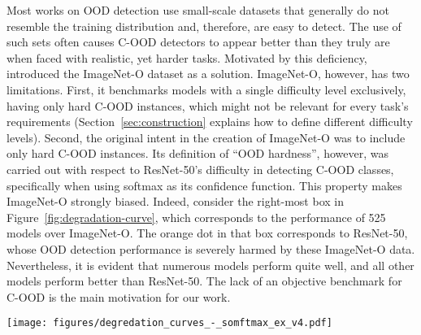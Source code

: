 \documentclass[table]{article} \usepackage{PRIMEarxiv}
\begin{document}
Most works on OOD detection use small-scale datasets that generally do not resemble the training distribution and, therefore, are easy to detect. 
The use of such sets often causes C-OOD detectors to appear better than they truly are when faced with realistic, yet harder tasks. Motivated by this deficiency, \citet{DBLP:conf/cvpr/HendrycksZBSS21} introduced the ImageNet-O dataset as a solution. ImageNet-O, however, has two limitations. First, it benchmarks models with a single difficulty level exclusively, having only hard C-OOD instances, which might not be relevant for every task's requirements (Section~\ref{sec:construction} explains how to define different difficulty levels).
Second, the original intent in the creation of ImageNet-O was to include only hard C-OOD instances. Its definition of ``OOD hardness'', however, was carried out with respect to ResNet-50's difficulty in detecting C-OOD classes, specifically when using softmax as its confidence function.
This property makes ImageNet-O strongly biased. Indeed, consider the right-most box in Figure~\ref{fig:degradation-curve}, which corresponds to the performance of 525 models over ImageNet-O. \textcolor{myorange}{The orange dot} in that box corresponds to ResNet-50, whose OOD detection performance is severely harmed by these ImageNet-O data. Nevertheless, it is evident that numerous models perform quite well, and all other models perform better than ResNet-50. 
The lack of an objective benchmark for C-OOD is the main motivation for our work.
\begin{figure*}[h]
    \centering
    \texttt{[image: figures/degredation\_curves\_-\_somftmax\_ex\_v4.pdf]}
    \caption{OOD performance across severity (difficulty) levels, using the benchmarks produced by our framework.
The detection performance decreases for all models as we increase the difficulty until it reaches near chance detection performance at the highest severity ($s_{10})$. The top curve belongs to \textcolor{myteal}{ViT-L/32-384}, which surpasses all models at every severity level. 
    We also observe how success or failure with regard to the previous C-OOD benchmark, ImageNet-O, does not reflect the models' true OOD detection performance since it was designed to specifically fool \textcolor{myorange}{ResNet-50}. At the bottom we provide visual examples for OOD classes from ImageNet-21k that may populate each severity level due to their similarity to ID classes from ImageNet-1k, and in this example, to a Monarch butterfly.}
    \label{fig:degradation-curve}
\end{figure*}
\end{document}
